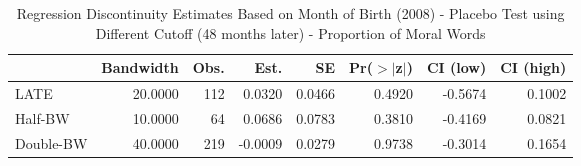 \begin{table}[ht]
\centering
\begin{tabular}{lrrrrrrr}
  \hline
 & Bandwidth & Obs. & Est. & SE & Pr($>$$|$z$|$) & CI (low) & CI (high) \\ 
  \hline
LATE & 20.0000 & 112 & 0.0320 & 0.0466 & 0.4920 & -0.5674 & 0.1002 \\ 
  Half-BW & 10.0000 & 64 & 0.0686 & 0.0783 & 0.3810 & -0.4169 & 0.0821 \\ 
  Double-BW & 40.0000 & 219 & -0.0009 & 0.0279 & 0.9738 & -0.3014 & 0.1654 \\ 
   \hline
\end{tabular}
\caption{Regression Discontinuity Estimates Based on Month of Birth (2008) - Placebo Test using Different Cutoff (48 months later) - Proportion of Moral Words} 
\label{tab:Xrd2008m_plac}
\end{table}
